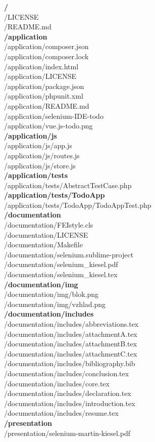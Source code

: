 \textbf{/} \\
/LICENSE \\
/README.md \\
\textbf{/application} \\
/application/composer.json \\
/application/composer.lock \\
/application/index.html \\
/application/LICENSE \\
/application/package.json \\
/application/phpunit.xml \\
/application/README.md \\
/application/selenium-IDE-todo \\
/application/vue.js-todo.png \\
\textbf{/application/js} \\
/application/js/app.js \\
/application/js/routes.js \\
/application/js/store.js \\
\textbf{/application/tests} \\
/application/tests/AbstractTestCase.php \\
\textbf{/application/tests/TodoApp} \\
/application/tests/TodoApp/TodoAppTest.php \\
\textbf{/documentation} \\
/documentation/FEIstyle.cls \\
/documentation/LICENSE \\
/documentation/Makefile \\
/documentation/selenium.sublime-project \\
/documentation/selenium\_kiesel.pdf \\
/documentation/selenium\_kiesel.tex \\
\textbf{/documentation/img} \\
/documentation/img/blok.png \\
/documentation/img/vzhlad.png \\
\textbf{/documentation/includes} \\
/documentation/includes/abbreviations.tex \\
/documentation/includes/attachmentA.tex \\
/documentation/includes/attachmentB.tex \\
/documentation/includes/attachmentC.tex \\
/documentation/includes/bibliography.bib \\
/documentation/includes/conclusion.tex \\
/documentation/includes/core.tex \\
/documentation/includes/declaration.tex \\
/documentation/includes/introduction.tex \\
/documentation/includes/resume.tex \\
\textbf{/presentation} \\
/presentation/selenium-martin-kiesel.pdf 
